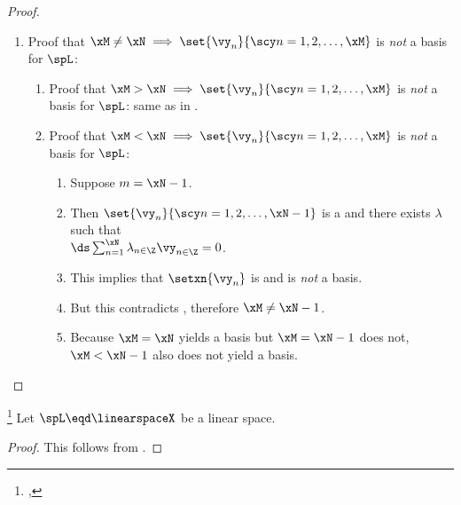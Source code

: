 \begin{proof}
\begin{enumerate}
  \item Proof that $\xM\neq\xN \implies \set{\vy_n}{\scy n=1,2,\ldots,\xM}$ is \emph{not} a {basis} for $\spL$:
    \begin{enumerate}
      \item Proof that $\xM>\xN \implies \set{\vy_n}{\scy n=1,2,\ldots,\xM}$ is \emph{not} a {basis} for $\spL$: same as in .
      \item Proof that $\xM<\xN \implies \set{\vy_n}{\scy n=1,2,\ldots,\xM}$ is \emph{not} a {basis} for $\spL$: 
        \begin{enumerate}
          \item Suppose $m=\xN-1$.
          \item Then $\set{\vy_n}{\scy n=1,2,\ldots,\xN-1}$ is a  and there exists $\lambda$ such that
            \\$\ds\sum_{n=1}^\xN \lambda_{n\in\Z} \vy_{n\in\Z} = 0$.
          \item This implies that $\setxn{\vy_n}$ is  and is \emph{not} a basis.
          \item But this contradicts , therefore $\xM\neq\xN-1$.
          \item Because $\xM=\xN$ yields a basis but $\xM=\xN-1$ does not, $\xM<\xN-1$ also does not yield a basis.
        \end{enumerate}
    \end{enumerate}
\end{enumerate}
\end{proof}

\begin{corollary}
\footnote{
  ,
  }
\label{cor:frm_MN}
Let $\spL\eqd\linearspaceX$ be a linear space.
\end{corollary}
\begin{proof}
This follows from .
\end{proof}


